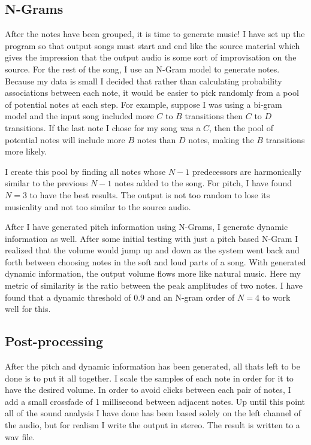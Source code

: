 \documentclass{amsart}
\theoremstyle{definition}
\begin{document}
\subsection{N-Grams}

After the notes have been grouped, it is time to generate music!
I have set up the program so that output songs must start and end like the source material
which gives the impression that the output audio is some sort of improvisation on the source.
For the rest of the song, I use an N-Gram model to generate notes.
Because my data is small I decided that rather than calculating probability associations between each note,
it would be easier to pick randomly from a pool of potential notes at each step.
For example, suppose I was using a bi-gram model and the input song included more $C$ to $B$ transitions then $C$ to $D$ transitions.
If the last note I chose for my song was a $C$, then the pool of potential notes will include more $B$ notes than $D$ notes,
making the $B$ transitions more likely.

I create this pool by finding all notes whose $N - 1$ predecessors are harmonically similar to the previous $N - 1$ notes added to the song. 
For pitch, I have found $N = 3$ to have the best results. The output is not too random to lose its musicality and not too similar to the source audio.

After I have generated pitch information using N-Grams, I generate dynamic information as well.
After some initial testing with just a pitch based N-Gram I realized that the volume would jump up and down as the system
went back and forth between choosing notes in the soft and loud parts of a song.
With generated dynamic information, the output volume flows more like natural music.
Here my metric of similarity is the ratio between the peak amplitudes of two notes.
I have found that a dynamic threshold of $0.9$ and an N-gram order of $N = 4$ to work well for this.

\subsection{Post-processing}

After the pitch and dynamic information has been generated, all thats left to be done is to put it all together.
I scale the samples of each note in order for it to have the desired volume.
In order to avoid clicks between each pair of notes, I add a small crossfade of 1 millisecond between adjacent notes.
Up until this point all of the sound analysis I have done has been based solely on the left channel of the audio, 
but for realism I write the output in stereo.
The result is written to a wav file.
\end{document}
